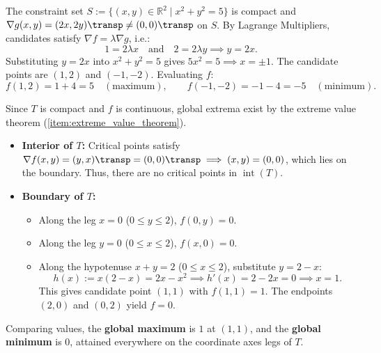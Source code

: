 \begin{exercisesolution}
The constraint set $S := \{(x,y) \in \mathbb{R}^2 \mid x^2 + y^2 = 5\}$ is compact and $\nabla g(x,y) = (2x, 2y)\transp \neq (0,0)\transp$ on $S$. By Lagrange Multipliers, candidates satisfy $\nabla f = \lambda \nabla g$, i.e.:
\[
1 = 2\lambda x \quad \text{and} \quad 2 = 2\lambda y \implies y = 2x.
\]
Substituting $y = 2x$ into $x^2 + y^2 = 5$ gives $5x^2 = 5 \implies x = \pm 1$. The candidate points are $(1,2)$ and $(-1,-2)$. Evaluating $f$:
\[
f(1,2) = 1 + 4 = 5 \quad (\text{maximum}), \qquad f(-1,-2) = -1 - 4 = -5 \quad (\text{minimum}).
\]
\end{exercisesolution}

\begin{exercisesolution}
Since $T$ is compact and $f$ is continuous, global extrema exist by the extreme value theorem
(\cref{item:extreme_value_theorem}).
\begin{itemize}
  \item \textbf{Interior of $T$:} Critical points satisfy $\nabla f(x,y) = (y,x)\transp = (0,0)\transp \implies (x,y) = (0,0)$, which lies on the boundary. Thus, there are no critical points in $\operatorname{int}(T)$.
  \item \textbf{Boundary of $T$:}
    \begin{itemize}
      \item Along the leg $x = 0$ ($0 \le y \le 2$), $f(0,y) = 0$.
      \item Along the leg $y = 0$ ($0 \le x \le 2$), $f(x,0) = 0$.
      \item Along the hypotenuse $x+y = 2$ ($0 \le x \le 2$), substitute $y = 2-x$:
        \[
        h(x) := x(2-x) = 2x - x^2 \implies h'(x) = 2 - 2x = 0 \implies x = 1.
        \]
        This gives candidate point $(1,1)$ with $f(1,1) = 1$. The endpoints $(2,0)$ and $(0,2)$ yield $f = 0$.
    \end{itemize}
\end{itemize}
Comparing values, the \textbf{global maximum} is $1$ at $(1,1)$, and the \textbf{global minimum} is $0$, attained everywhere on the coordinate axes legs of $T$.
\end{exercisesolution}
